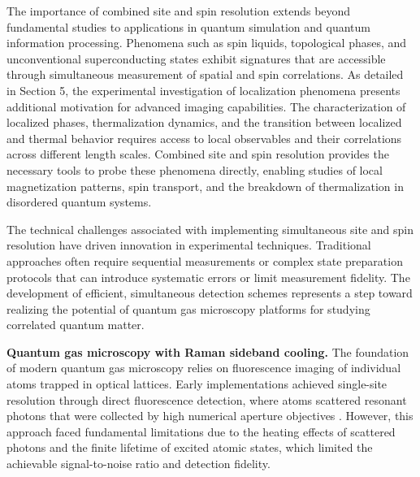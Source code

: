 The importance of combined site and spin resolution extends beyond fundamental studies to applications in quantum simulation and quantum information processing. Phenomena such as spin liquids, topological phases, and unconventional superconducting states exhibit signatures that are accessible through simultaneous measurement of spatial and spin correlations. As detailed in Section 5, the experimental investigation of localization phenomena presents additional motivation for advanced imaging capabilities. The characterization of localized phases, thermalization dynamics, and the transition between localized and thermal behavior requires access to local observables and their correlations across different length scales. Combined site and spin resolution provides the necessary tools to probe these phenomena directly, enabling studies of local magnetization patterns, spin transport, and the breakdown of thermalization in disordered quantum systems.

The technical challenges associated with implementing simultaneous site and spin resolution have driven innovation in experimental techniques. Traditional approaches often require sequential measurements or complex state preparation protocols that can introduce systematic errors or limit measurement fidelity. The development of efficient, simultaneous detection schemes represents a step toward realizing the potential of quantum gas microscopy platforms for studying correlated quantum matter.



\textbf{Quantum gas microscopy with Raman sideband cooling.}
The foundation of modern quantum gas microscopy relies on fluorescence imaging of individual atoms trapped in optical lattices. Early implementations achieved single-site resolution through direct fluorescence detection, where atoms scattered resonant photons that were collected by high numerical aperture objectives \cite{bakr_quantum_2009,sherson_single-atom-resolved_2010}. However, this approach faced fundamental limitations due to the heating effects of scattered photons and the finite lifetime of excited atomic states, which limited the achievable signal-to-noise ratio and detection fidelity.

